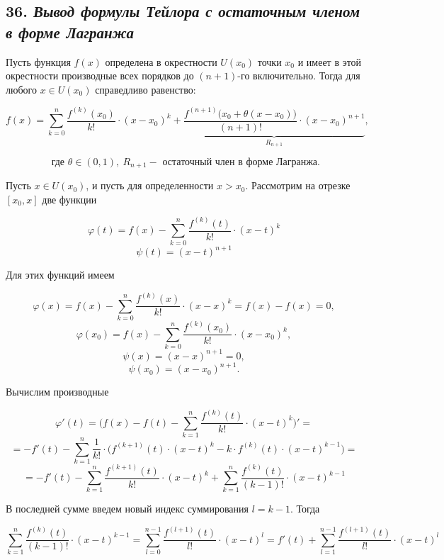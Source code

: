 \subsection*{36. \textit{Вывод формулы Тейлора с остаточным членом в форме Лагранжа}}

Пусть функция $f(x)$ определена в окрестности $U(x_0)$ точки $x_0$ и имеет в этой окрестности производные всех порядков до $(n + 1)$-го включительно. Тогда для любого $x \in U(x_0)$ справедливо равенство:
\begin{mainQuote}

$$ f(x) = \sum\limits_{k=0}^n\dfrac{f^{(k)}(x_0)}{k!}\cdot (x - x_0)^k + \underbrace{\dfrac{f^{(n+1)}\big(x_0 + \theta(x - x_0)\big)}{(n+1)!}\cdot (x - x_0)^{n + 1}}_{ R_{n+1}},  $$

$$ \text{ где } \theta \in (0, 1), \ R_{n+1} - \text{ остаточный член в форме Лагранжа}. $$
\end{mainQuote}

Пусть $x \in U(x_0)$, и пусть для определенности $x > x_0$. Рассмотрим на отрезке $[x_0, x]$ две функции

$$
\varphi(t) = f(x) - \sum\limits_{k=0}^n\dfrac{f^{(k)}(t)}{k!}\cdot (x - t)^k
$$ $$
\psi(t) = (x - t)^{n+1}
$$

Для этих функций имеем

$$
\varphi(x) = f(x) - \sum\limits_{k=0}^n\dfrac{f^{(k)}(x)}{k!}\cdot (x - x)^k = f(x) - f(x) = 0, 
$$ $$
\varphi(x_0) = f(x) - \sum\limits_{k=0}^n\dfrac{f^{(k)}(x_0)}{k!}\cdot (x -  x_0)^k,
$$ $$\psi(x) = (x - x)^{n+1} = 0,$$ $$\psi(x_0) = (x - x_0)^{n+1}.$$

Вычислим производные

$$
\varphi'(t) = \bigg(f(x) - f(t) - \sum\limits_{k=1}^n\dfrac{f^{(k)}(t)}{k!}\cdot (x - t)^k\bigg)' = $$ $$=-f'(t) - \sum\limits_{k=1}^n \dfrac{1}{k!}\cdot\bigg(f^{(k+1)}(t) \cdot (x - t)^k - k\cdot f^{(k)}(t)\cdot(x - t)^{k-1}\bigg) =
$$ $$
= -f'(t) - \sum\limits_{k=1}^n \dfrac{f^{(k+1)}(t) }{k!}\cdot (x - t)^k + \sum\limits_{k=1}^n\dfrac{f^{(k)}(t)}{(k - 1)!}\cdot(x - t)^{k-1}  
$$

В последней сумме введем новый индекс суммирования $l = k - 1$. Тогда

$$
\sum\limits_{k=1}^n\dfrac{f^{(k)}(t)}{(k - 1)!}\cdot(x - t)^{k-1} = \sum\limits_{l=0}^{n-1}\dfrac{f^{(l+1)}(t)}{l!}\cdot(x - t)^{l}= f'(t)+ \sum\limits_{l=1}^{n-1}\dfrac{f^{(l+1)}(t)}{l!}\cdot(x - t)^{l}
$$

